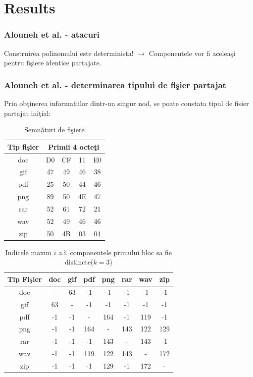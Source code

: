 \documentclass{beamer}
\begin{document}
\section{Results}
\begin{frame}
    \frametitle{Alouneh et al. - atacuri}
    Construirea polinomului este determinista! $\rightarrow$ Componentele vor fi acelea\c{s}i pentru fi\c{s}iere identice partajate.
\end{frame}
\begin{frame}
    \frametitle{Alouneh et al. - determinarea tipului de fi\c{s}ier partajat}
    Prin ob\c{t}inerea informatiilor dintr-un singur nod, se poate constata tipul de fisier partajat ini\c{t}ial:
     {
        \begin{table}[b]
        \bigskip
        \begin{center}
        \caption{Semn\u{a}turi de fi\c{s}iere}\label{tb:margins}
        \label{table:sign}
            \begin{tabular}{ccccc}
            Tip fi\c{s}ier &  \multicolumn{4}{c}{Primii 4 octe\c{t}i}\\ \hline 
            doc &  D0 & CF & 11 & E0\\
            gif & 47 & 49 & 46 & 38 \\
            pdf & 25 & 50 & 44 & 46 \\
            png & 89 & 50 & 4E & 47 \\
            rar & 52 & 61 & 72 & 21 \\
            wav & 52 & 49 & 46 & 46 \\
            zip & 50 & 4B & 03 & 04\\  \hline
            \end{tabular}
        \end{center}
        \bigskip
        \end{table}
    }
     {
    \begin{table}[t]
        \begin{center}
        \caption{Indicele maxim $i$ a.\^{i}. componentele primului bloc sa fie distincte($k=3$)}\label{tb:margins}
        \label{table:k3}
        \begin{tabular}{cccccccc}
        Tip Fi\c{s}ier & doc & gif & pdf & png & rar & wav & zip \\\hline
          doc & - & 63 & -1 & -1 & -1 & -1 & -1\\
          gif & 63 & - & -1 & -1 & -1 & -1 & -1\\
          pdf & -1 & -1 & - & 164 & -1 & 119 & -1\\
          png & -1 & -1 & 164 & - & 143 & 122 & 129\\
          rar & -1 & -1 & -1 & 143 & - & 143 & -1\\
          wav & -1 & -1 & 119 & 122 & 143 & - & 172\\
          zip & -1 & -1 & -1 & 129 & -1 & 172 & -\\ \hline
        \end{tabular}
        \end{center}
        \bigskip
    \end{table}
    }
\end{frame}
\end{document}
